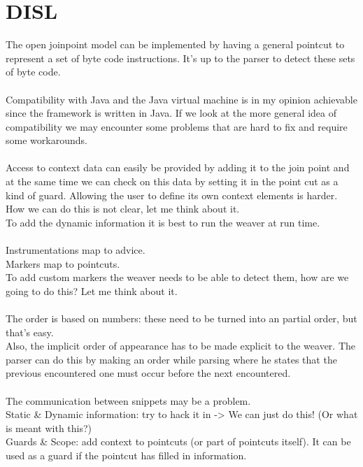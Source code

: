 \documentclass[a4paper]{report}
\begin{document}
\section{DISL}
The open joinpoint model can be implemented by having a general pointcut to represent a set of byte code instructions. It's up to the parser to detect these sets of byte code.\\
\\
Compatibility with Java and the Java virtual machine is in my opinion achievable since the framework is written in Java. If we look at the more general idea of compatibility we may encounter some problems that are hard to fix and require some workarounds.\\
\\
Access to context data can easily be provided by adding it to the join point and at the same time we can check on this data by setting it in the point cut as a kind of guard. Allowing the user to define its own context elements is harder. How we can do this is not clear, let me think about it.\\
To add the dynamic information it is best to run the weaver at run time.\\
\\
Instrumentations map to advice.\\
Markers map to pointcuts.\\
To add custom markers the weaver needs to be able to detect them, how are we going to do this? Let me think about it.\\
\\
The order is based on numbers: these need to be turned into an partial order, but that's easy.\\
Also, the implicit order of appearance has to be made explicit to the weaver. The parser can do this by making an order while parsing where he states that the previous encountered one must occur before the next encountered.\\
\\
The communication between snippets may be a problem.\\
Static \& Dynamic information: try to hack it in -> We can just do this! (Or what is meant with this?)\\
Guards \& Scope: add context to pointcuts (or part of pointcuts itself). It can be used as a guard if the pointcut has filled in information.
\end{document}
